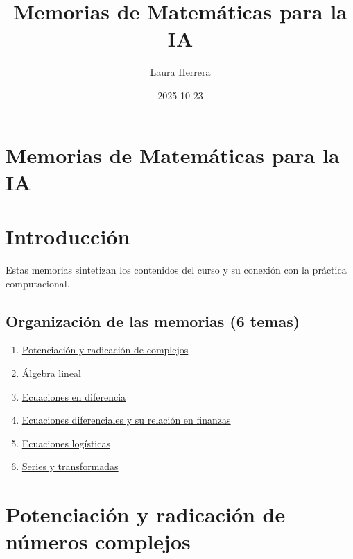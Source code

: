 \documentclass[
  letterpaper,
  DIV=11,
  numbers=noendperiod]{scrreprt}
\title{Memorias de Matemáticas para la IA}
\author{Laura Herrera}
\date{2025-10-23}
\providecommand{\tightlist}{%
  \setlength{\itemsep}{0pt}\setlength{\parskip}{0pt}}
\begin{document}
\maketitle



\chapter{Memorias de Matemáticas para la
IA}\label{memorias-de-matemuxe1ticas-para-la-ia}


\chapter{Introducción}\label{introducciuxf3n}

Estas memorias sintetizan los contenidos del curso y su conexión con la
práctica computacional.

\section{Organización de las memorias (6
temas)}\label{organizaciuxf3n-de-las-memorias-6-temas}

\begin{enumerate}
\def\labelenumi{\arabic{enumi}.}
\tightlist
\item
  \href{complejos-potenciacion-radicacion.qmd}{Potenciación y radicación
  de complejos}
\item
  \href{algebra-lineal.qmd}{Álgebra lineal}
\item
  \href{ecuaciones-en-diferencia.qmd}{Ecuaciones en diferencia}
\item
  \href{ecuaciones-diferenciales-finanzas.qmd}{Ecuaciones diferenciales
  y su relación en finanzas}
\item
  \href{ecuaciones-logisticas.qmd}{Ecuaciones logísticas}
\item
  \href{series-y-transformadas.qmd}{Series y transformadas}
\end{enumerate}


\chapter{Potenciación y radicación de números
complejos}\label{potenciaciuxf3n-y-radicaciuxf3n-de-nuxfameros-complejos}
\end{document}
